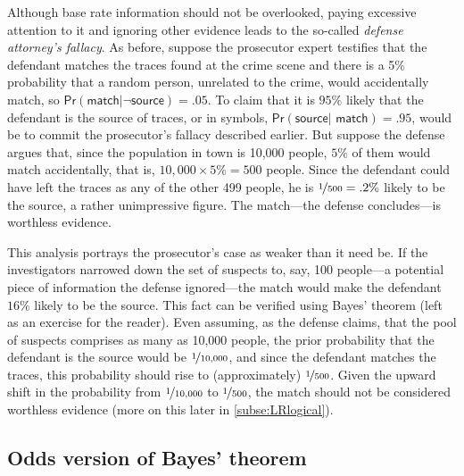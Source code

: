 \documentclass{article}
\newcommand{\pr}{\mathsf{Pr}}
\begin{document}
Although base rate information should not be overlooked, paying excessive attention to it and ignoring other evidence leads to the so-called \emph{defense attorney's fallacy}. %
As before, suppose the prosecutor expert  testifies that the defendant  matches the traces found at the crime scene and there is a 5\% probability that a random person, unrelated to the crime, would accidentally  match, so $\pr(\textsf{match}\vert \neg\textsf{source})=.05$. 
To claim that it is $95\%$ likely that the defendant is the source of traces, or in symbols, $\pr(\textsf{source}\vert \textsf{ match})=.95$, would be to commit the prosecutor's fallacy described earlier.  
But suppose the defense argues that, since the population in town is 10,000 people, $5\%$ of them would match accidentally, that is,  $10,000\times 5\%=500$ people. Since the defendant could have left the traces as any of the other 499 people, he is $\nicefrac{1}{500}=.2\%$ likely to be the source, a rather unimpressive figure. 
The match---the defense concludes---is worthless evidence.

This analysis portrays the prosecutor's case 
as weaker than it need be. 
If the investigators narrowed down the set of suspects to, say, 100 people---a potential piece of information the defense ignored---the match would make the defendant $16\%$ likely to be the source. This  fact can be verified using Bayes' theorem (left as an exercise for the reader).
Even assuming, as the defense claims, that the pool of suspects comprises as many as 10,000 people, the prior probability that the defendant is the source would be $\nicefrac{1}{10,000}$, and since the defendant matches the traces, this probability should rise to (approximately) $\nicefrac{1}{500}$.
Given the upward shift in the probability from $\nicefrac{1}{10,000}$ to $\nicefrac{1}{500}$, the  match should not be considered worthless evidence (more on this later in \ref{subse:LRlogical}).  %






























\subsection{Odds version of Bayes' theorem}
\label{sec:odd-bayes}
\end{document}
